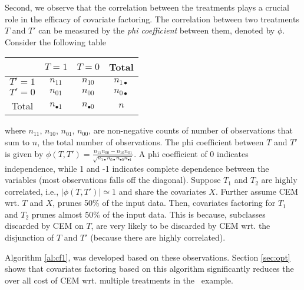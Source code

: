 Second, we observe  that the correlation between the treatments  plays a crucial role in the  efficacy  of covariate factoring. The
 correlation between two treatments $T$ and $T'$ can be measured by the {\em phi coefficient} between them, denoted by $\phi$. Consider the following table
\vspace{-0.15cm}
\begin{center}

\scriptsize
\begin{tabular}{|c|c|c|c|}
\hline
   & $T=1$ & $T=0$ & Total  \\ \hline
  $T'=1$ & $n_{11}$ & $n_{10}$ & $n_{1\bullet}$ \\ \hline
  $T'=0$ & $n_{01}$ & $n_{00}$ & $n_{0\bullet}$ \\ \hline
  Total & $n_{\bullet1}$ & $n_{\bullet0}$ & $n$ \\
  \hline
\end{tabular}

\end{center}

\noindent  where $n_{11}$, $n_{10}$, $n_{01}$, $n_{00}$, are non-negative counts of number of observations that sum to $n$, the total number of observations.
 The phi coefficient between $T$ and $T'$ is given by
  $\phi(T,T') ={\frac  {n_{{11}}n_{{00}}-n_{{10}}n_{{01}}}{{\sqrt  {n_{{1\bullet }}n_{{0\bullet }}n_{{\bullet 0}}n_{{\bullet 1}}}}}}$. A phi coefficient of 0  indicates independence, while 1 and -1 indicates complete dependence between the variables (most observations falls off the diagonal).   Suppose $T_1$ and $T_2$ are highly correlated, i.e.,  $|\phi(T,T')|\simeq 1$ and share the covariates $X$. Further assume CEM wrt. $T$ and $X$, prunes 50\% of the input data.
Then, covariates factoring for $T_1$ and $T_2$ prunes almost 50\% of the input data. This is because, subclasses discarded by
CEM on $T$, are very likely to be discarded by CEM wrt. the disjunction of $T$ and $T'$ (because there are highly correlated). 

Algorithm \ref{al:cf1}, was developed based on these observations.  Section \ref{sec:opt} shows that covariates factoring based on this algorithm significantly reduces the over all cost of CEM wrt. multiple treatments in the \delay\ example.

